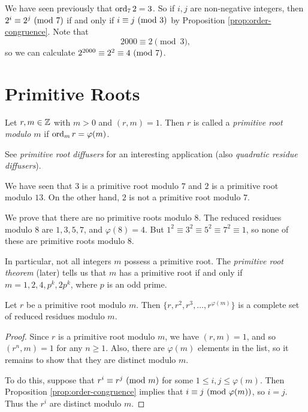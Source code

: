 \begin{example}
  We have seen previously that $\operatorname{ord}_7 2 = 3$.
  So if $i, j$ are non-negative integers,
  then $2^i \equiv 2^j \ (\mathrm{mod}\ 7)$
  if and only if $i \equiv j \ (\mathrm{mod}\ 3)$
  by Proposition \ref{prop:order-congruence}.
  Note that
  \[
    2000 \equiv 2 \pmod{3},
  \]
  so we can calculate
  $2^{2000} \equiv 2^2 \equiv 4 \ (\mathrm{mod}\ 7)$.
\end{example}

\section{Primitive Roots}

\begin{definition}
  Let $r, m \in \mathbb{Z}$ with $m > 0$ and
  $(r, m) = 1$. Then $r$ is called a
  \emph{primitive root modulo $m$} if
  $\operatorname{ord}_m r = \varphi(m)$.
\end{definition}

\begin{remark}
  See \emph{primitive root diffusers}
  for an interesting application
  (also \emph{quadratic residue diffusers}).
\end{remark}

\begin{example}
  We have seen that
  $3$ is a primitive root modulo $7$ and
  $2$ is a primitive root modulo $13$.
  On the other hand, $2$ is not a primitive
  root modulo $7$.
\end{example}

\begin{example}
  We prove that there are no primitive
  roots modulo $8$. The reduced residues
  modulo $8$ are $1, 3, 5, 7$, and
  $\varphi(8) = 4$. But
  $1^2 \equiv 3^2 \equiv 5^2 \equiv 7^2 \equiv 1$,
  so none of these are primitive roots
  modulo $8$.

  In particular, not all
  integers $m$ possess a primitive root.
  The \emph{primitive root theorem} (later)
  tells us that $m$ has a primitive root
  if and only if $m = 1, 2, 4, p^k, 2p^k$,
  where $p$ is an odd prime.
\end{example}

\begin{prop}\label{prop:primitive-root-generate}
  Let $r$ be a primitive root modulo $m$.
  Then
  $\{r, r^2, r^3, \dots, r^{\varphi(m)}\}$
  is a complete set of reduced residues
  modulo $m$.
\end{prop}

\begin{proof}
  Since $r$ is a primitive root modulo $m$,
  we have $(r, m) = 1$, and so
  $(r^n, m) = 1$ for any $n \ge 1$.
  Also, there are $\varphi(m)$ elements
  in the list, so it remains to show that
  they are distinct modulo $m$.

  To do this, suppose that $r^i \equiv r^j \ (\mathrm{mod}\ m)$
  for some $1 \le i, j \le \varphi(m)$.
  Then Proposition \ref{prop:order-congruence}
  implies that
  $i \equiv j \ (\mathrm{mod}\ {\varphi(m)})$, so
  $i = j$. Thus the $r^i$ are distinct
  modulo $m$.
\end{proof}

